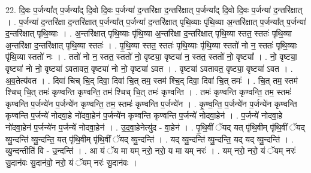 \documentclass[17pt]{extarticle}
\begin{document}
22. दि॒वः प॒र्जन्या᳚त् प॒र्जन्या᳚द् दि॒वो दि॒वः प॒र्जन्या॑ द॒न्तरि॑क्षा द॒न्तरि॑क्षात् प॒र्जन्या᳚द् दि॒वो दि॒वः प॒र्जन्या॑ द॒न्तरि॑क्षात् । . प॒र्जन्या॑ द॒न्तरि॑क्षा द॒न्तरि॑क्षात् प॒र्जन्या᳚त् प॒र्जन्या॑ द॒न्तरि॑क्षात् पृथि॒व्याः पृ॑थि॒व्या अ॒न्तरि॑क्षात् प॒र्जन्या᳚त् प॒र्जन्या॑ द॒न्तरि॑क्षात् पृथि॒व्याः । . अ॒न्तरि॑क्षात् पृथि॒व्याः पृ॑थि॒व्या अ॒न्तरि॑क्षा द॒न्तरि॑क्षात् पृथि॒व्या स्तत॒ स्ततः॑ पृथि॒व्या अ॒न्तरि॑क्षा द॒न्तरि॑क्षात् पृथि॒व्या स्ततः॑ । . पृ॒थि॒व्या स्तत॒ स्ततः॑ पृथि॒व्याः पृ॑थि॒व्या स्ततो॑ नो न॒ स्ततः॑ पृथि॒व्याः पृ॑थि॒व्या स्ततो॑ नः । . ततो॑ नो न॒ स्तत॒ स्ततो॑ नो॒ वृष्ट्या॒ वृष्ट्या॑ न॒ स्तत॒ स्ततो॑ नो॒ वृष्ट्या᳚ । . नो॒ वृष्ट्या॒ वृष्ट्या॑ नो नो॒ वृष्ट्या॑ ऽवतावत॒ वृष्ट्या॑ नो नो॒ वृष्ट्या॑ ऽवत । . वृष्ट्या॑ ऽवतावत॒ वृष्ट्या॒ वृष्ट्या॑ ऽवत । . अ॒व॒तेत्य॑वत । . दिवा॑ चिच् चि॒द् दिवा॒ दिवा॑ चि॒त् तम॒ स्तम॑ श्चि॒द् दिवा॒ दिवा॑ चि॒त् तमः॑ । . चि॒त् तम॒ स्तम॑ श्चिच् चि॒त् तमः॑ कृण्वन्ति कृण्वन्ति॒ तम॑ श्चिच् चि॒त् तमः॑ कृण्वन्ति । . तमः॑ कृण्वन्ति कृण्वन्ति॒ तम॒ स्तमः॑ कृण्वन्ति प॒र्जन्ये॑न प॒र्जन्ये॑न कृण्वन्ति॒ तम॒ स्तमः॑ कृण्वन्ति प॒र्जन्ये॑न । . कृ॒ण्व॒न्ति॒ प॒र्जन्ये॑न प॒र्जन्ये॑न कृण्वन्ति कृण्वन्ति प॒र्जन्ये॑ नोदवा॒हे नो॑दवा॒हेन॑ प॒र्जन्ये॑न कृण्वन्ति कृण्वन्ति प॒र्जन्ये॑ नोदवा॒हेन॑ । . प॒र्जन्ये॑ नोदवा॒हे नो॑दवा॒हेन॑ प॒र्जन्ये॑न प॒र्जन्ये॑ नोदवा॒हेन॑ । . उ॒द॒वा॒हेनेत्यु॑द - वा॒हेन॑ । . पृ॒थि॒वीं ॅयद् यत् पृ॑थि॒वीम् पृ॑थि॒वीं ॅयद् व्यु॒न्दन्ति॑ व्यु॒न्दन्ति॒ यत् पृ॑थि॒वीम् पृ॑थि॒वीं ॅयद् व्यु॒न्दन्ति॑ । . यद् व्यु॒न्दन्ति॑ व्यु॒न्दन्ति॒ यद् यद् व्यु॒न्दन्ति॑ । . व्यु॒न्दन्तीति॑ वि - उ॒न्दन्ति॑ । . आ यं ॅय मा यम् नरो॒ नरो॒ य मा यम् नरः॑ । . यम् नरो॒ नरो॒ यं ॅयम् नरः॑ सु॒दान॑वः सु॒दान॑वो॒ नरो॒ यं ॅयम् नरः॑ सु॒दान॑वः । \newline
\end{document}
